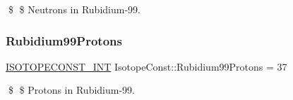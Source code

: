 \$ \$ Neutrons in Rubidium-\/99. \mbox{\label{group___isotope_const-_rubidium-_rb99_gab709ef25d937de12143e72a9bc0cb643}} 
\subsubsection{\texorpdfstring{Rubidium99\+Protons}{Rubidium99Protons}}
{\footnotesize\ttfamily \mbox{\hyperlink{group___isotope_const-_macros_ga5f18360b3e99483a35c32d789e62621c}{I\+S\+O\+T\+O\+P\+E\+C\+O\+N\+S\+T\+\_\+\+I\+NT}} Isotope\+Const\+::\+Rubidium99\+Protons = 37}

\$ \$ Protons in Rubidium-\/99. 
